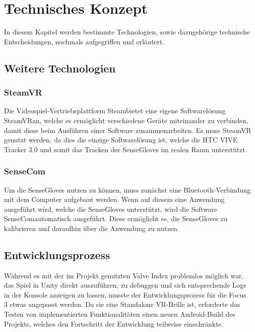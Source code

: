 \chapter{Technisches Konzept}
In diesem Kapitel werden bestimmte Technologien, sowie dazugehörige technische Entscheidungen, nochmals aufgegriffen und erläutert.
\section{Weitere Technologien}
\subsection{SteamVR}
Die Videospiel-Vertriebsplattform \dq Steam\dq bietet eine eigene Softwarelösung \dq SteamVR\dq an, welche es ermöglicht verschiedene Geräte miteinander zu verbinden, damit diese beim Ausführen einer Software zusammenarbeiten. Es muss SteamVR genutzt werden, da dies die einzige Softwarelösung ist, welche die HTC VIVE Tracker 3.0 und somit das Tracken der SenseGloves im realen Raum unterstützt.
\subsection{SenseCom}
Um die SenseGloves nutzen zu können, muss zunächst eine Bluetooth-Verbindung mit dem Computer aufgebaut werden. Wenn auf diesem eine Anwendung ausgeführt wird, welche die SenseGloves unterstützt, wird die Software \dq SenseCom\dq automatisch ausgeführt. Diese ermöglicht es, die SenseGloves zu kalibrieren und daraufhin über die Anwendung zu nutzen.

\section{Entwicklungsprozess}
Während es mit der im Projekt genutzten Valve Index problemlos möglich war, das Spiel in Unity direkt auszuführen, zu debuggen und sich entsprechende Logs in der Konsole anzeigen zu lassen, musste der Entwicklungsprozess für die Focus 3 etwas angepasst werden. Da sie eine Standalone VR-Brille ist, erforderte das Testen von implementierten Funktionalitäten einen neuen Android-Build des Projekts, welches den Fortschritt der Entwicklung teilweise einschränkte.

